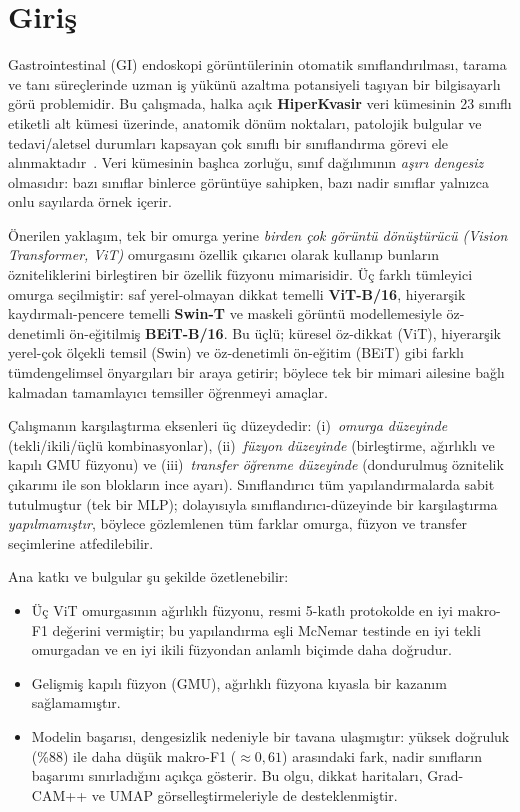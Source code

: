 \section{Giriş}
\label{sec:intro}

Gastrointestinal (GI) endoskopi görüntülerinin otomatik sınıflandırılması,
tarama ve tanı süreçlerinde uzman iş yükünü azaltma potansiyeli taşıyan bir
bilgisayarlı görü problemidir. Bu çalışmada, halka açık \textbf{HiperKvasir}
veri kümesinin 23 sınıflı etiketli alt kümesi üzerinde, anatomik dönüm
noktaları, patolojik bulgular ve tedavi/aletsel durumları kapsayan çok sınıflı
bir sınıflandırma görevi ele alınmaktadır~\cite{borgli2020hyperkvasir}. Veri
kümesinin başlıca zorluğu, sınıf dağılımının \emph{aşırı dengesiz} olmasıdır:
bazı sınıflar binlerce görüntüye sahipken, bazı nadir sınıflar yalnızca onlu
sayılarda örnek içerir.

Önerilen yaklaşım, tek bir omurga yerine \emph{birden çok görüntü dönüştürücü
(Vision Transformer, ViT)} omurgasını özellik çıkarıcı olarak kullanıp bunların
özniteliklerini birleştiren bir özellik füzyonu mimarisidir. Üç farklı tümleyici
omurga seçilmiştir: saf yerel-olmayan dikkat temelli \textbf{ViT-B/16}, hiyerarşik
kaydırmalı-pencere temelli \textbf{Swin-T} ve maskeli görüntü modellemesiyle
öz-denetimli ön-eğitilmiş \textbf{BEiT-B/16}. Bu üçlü; küresel öz-dikkat (ViT),
hiyerarşik yerel-çok ölçekli temsil (Swin) ve öz-denetimli ön-eğitim (BEiT) gibi
farklı tümdengelimsel önyargıları bir araya getirir; böylece tek bir mimari ailesine
bağlı kalmadan tamamlayıcı temsiller öğrenmeyi amaçlar.

Çalışmanın karşılaştırma eksenleri üç düzeydedir: (i)~\emph{omurga düzeyinde}
(tekli/ikili/üçlü kombinasyonlar), (ii)~\emph{füzyon düzeyinde} (birleştirme,
ağırlıklı ve kapılı GMU füzyonu) ve (iii)~\emph{transfer öğrenme düzeyinde}
(dondurulmuş öznitelik çıkarımı ile son blokların ince ayarı). Sınıflandırıcı
tüm yapılandırmalarda sabit tutulmuştur (tek bir MLP); dolayısıyla
sınıflandırıcı-düzeyinde bir karşılaştırma \emph{yapılmamıştır}, böylece
gözlemlenen tüm farklar omurga, füzyon ve transfer seçimlerine atfedilebilir.

Ana katkı ve bulgular şu şekilde özetlenebilir:
\begin{itemize}
  \item Üç ViT omurgasının ağırlıklı füzyonu, resmi 5-katlı protokolde en iyi
        makro-F1 değerini vermiştir; bu yapılandırma eşli McNemar testinde en iyi
        tekli omurgadan ve en iyi ikili füzyondan anlamlı biçimde daha doğrudur.
  \item Gelişmiş kapılı füzyon (GMU), ağırlıklı füzyona kıyasla bir kazanım
        sağlamamıştır.
  \item Modelin başarısı, dengesizlik nedeniyle bir tavana ulaşmıştır: yüksek
        doğruluk (\%88) ile daha düşük makro-F1 ($\approx 0{,}61$) arasındaki fark,
        nadir sınıfların başarımı sınırladığını açıkça gösterir. Bu olgu, dikkat
        haritaları, Grad-CAM++ ve UMAP görselleştirmeleriyle de desteklenmiştir.
\end{itemize}
